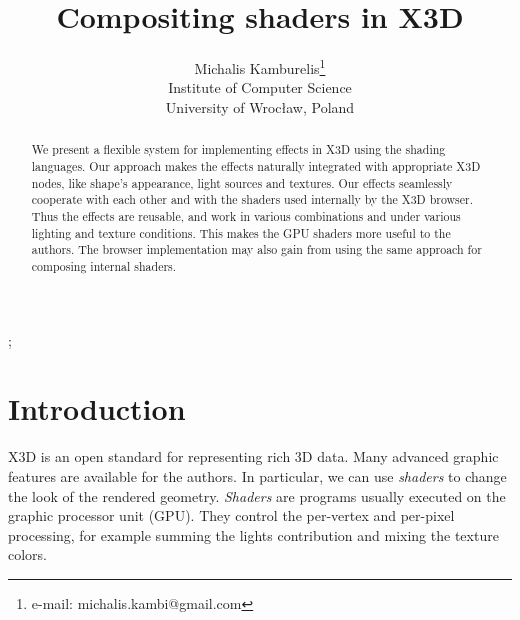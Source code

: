 \documentclass{acmsiggraph}                     %
\title{Compositing shaders in X3D}
\author{Michalis Kamburelis\thanks{e-mail: michalis.kambi@gmail.com}\\Institute of Computer Science\\University of Wroc{\l}aw, Poland}
\begin{document}

\maketitle

\begin{abstract}
We present a flexible system for implementing effects in X3D
using the shading languages.
Our approach makes the effects naturally integrated with appropriate
X3D nodes, like shape's appearance, light sources and textures.
Our effects seamlessly cooperate with each other and with
the shaders used internally by the X3D browser.
Thus the effects are reusable, and work in various combinations
and under various lighting and texture conditions.
This makes the GPU shaders more useful to the authors.
The browser implementation may also gain from using the same approach
for composing internal shaders.
\end{abstract}

\begin{CRcatlist}
  ;
\end{CRcatlist}

\keywordlist

\section{Introduction}

\copyrightspace

X3D \cite{x3d:spec} is an open standard for representing rich 3D data.
Many advanced graphic features are available for the authors.
In particular, we can use \emph{shaders} to change the look of the rendered
geometry.
\emph{Shaders} are programs usually executed on the graphic processor unit
(GPU). They control the per-vertex and per-pixel processing,
for example summing the lights contribution
and mixing the texture colors.
\end{document}
